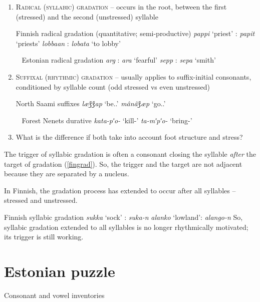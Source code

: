 \documentclass[a4paper, 12pt]{article}
\begin{document}
	\begin{enumerate}[$\gg$]
		\item \textsc{Radical (syllabic) gradation} -- occurs in the root, between the first (stressed) and the second (unstressed) syllable
		
		\pex Finnish radical gradation (quantitative; semi-productive)
			\a \emph{pappi} `priest' : \emph{papit} `priests'
			\a \emph{lobbaan} : \emph{lobata} `to lobby'
		\xe
		
		\pex~ Estonian radical gradation
			\a \emph{arg} : \emph{ara} `fearful'
			\a \emph{sepp} : \emph{sepa} `smith' 
		\xe
		
		\item \textsc{Suffixal (rhythmic) gradation} -- usually applies to suffix-initial consonants, conditioned by syllable count (odd stressed vs even unstressed)
		
		\pex North Saami suffixes \parencite[p. 149]{korhonen1981}
			\a \emph{læǯǯap} `be.{\Pot}.{\Fpl}'
			\a \emph{m\^{a}n\^{a}ǯæp} `go.{\Pot}.{\Fpl}'
		\xe
		
		\pex~ Forest Nenets durative \parencite[p. 359]{salminen2007}
			\a \emph{kata-pʹo-} `kill-{\Dur}'
			\a \emph{ta-mʹpʹo-} `bring-{\Dur}'
		\xe
		\item What is the difference if both take into account foot structure and stress?
	\end{enumerate}
	The trigger of syllabic gradation is often a consonant closing the syllable \emph{after} the target of gradation (\ref{fingrad}). So, the trigger and the target are not adjacent because they are separated by a nucleus.  
		
	In Finnish, the gradation process has extended to occur after all syllables -- stressed and unstressed. 
	
	\pex\label{fingrad}Finnish syllabic gradation
		\a \emph{sukka} `sock' : {\Gen} \emph{suka-n}
		\a \emph{alanko} `lowland': {\Gen} \emph{alango-n} 
	\xe
	So, syllabic gradation extended to all syllables is no longer rhythmically motivated; its trigger is still working.

	\section{Estonian puzzle}
	
	Consonant and vowel inventories \parencite{asu-teras2009}
	
\end{document}
